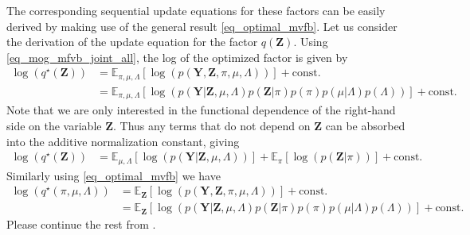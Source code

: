 \documentclass[10pt ]{article}
\begin{document}
The corresponding sequential update equations for these factors can be easily derived by making use of the general result \eqref{eq_optimal_mvfb}. Let us consider the derivation of the update equation for the factor $q(\mathbf{Z})$. Using \eqref{eq_mog_mfvb_joint_all}, the log of the optimized factor is given by
\begin{align}
\log \left( q^{\star}(\mathbf{Z}) \right) &= \mathbb{E}_{\pi, \mu, \Lambda} \left[ \log \left(p(\mathbf{Y}, \mathbf{Z}, \pi, \mu, \Lambda) \right) \right] + \mathrm{const.} \nonumber \\
&= \mathbb{E}_{\pi, \mu, \Lambda} \left[ \log \left(p(\mathbf{Y}|\mathbf{Z}, \mu, \Lambda)p(\mathbf{Z}|\pi) p(\pi) p(\mu | \Lambda) p (\Lambda) \right) \right] + \mathrm{const.}
\label{eq_mfvb_mog_qz}
\end{align}
Note that we are only interested in the functional dependence of the right-hand side on the variable $\mathbf{Z}$. Thus any terms that do not depend on $\mathbf{Z}$ can be absorbed into the additive normalization constant, giving
\begin{align}
\log \left( q^{\star}(\mathbf{Z}) \right) &= \mathbb{E}_{\mu, \Lambda}  \left[ \log \left(p(\mathbf{Y}|\mathbf{Z}, \mu, \Lambda) \right) \right] + \mathbb{E}_{\pi} \left[ \log (p(\mathbf{Z}|\pi )) \right] + \mathrm{const.}
\label{eq_mfvb_mog_qz_2}
\end{align}
Similarly using \eqref{eq_optimal_mvfb} we have 
\begin{align}
\log \left( q^{\star}(\pi, \mu, \Lambda) \right)&=  \mathbb{E}_{\mathbf{Z}}  \left[ \log \left(p(\mathbf{Y}, \mathbf{Z}, \pi, \mu, \Lambda) \right) \right] + \mathrm{const.} \nonumber \\
&= \mathbb{E}_{\mathbf{Z}} \left[ \log \left(p(\mathbf{Y}|\mathbf{Z}, \mu, \Lambda)p(\mathbf{Z}|\pi) p(\pi) p(\mu | \Lambda) p (\Lambda) \right) \right] + \mathrm{const.}
\label{eq_mfvb_mog_qz_2}
\end{align}
Please continue the rest from \cite{bishop2006pattern}.





\end{document}
